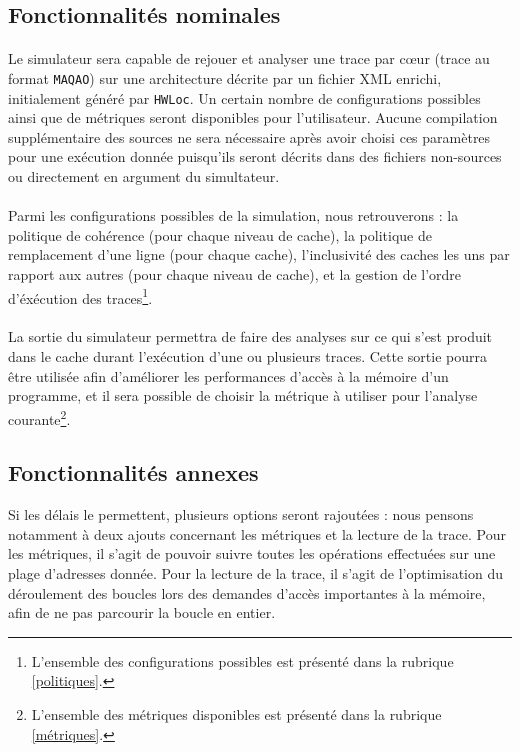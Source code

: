 \subsection{Fonctionnalités nominales}

\paragraph{}
Le simulateur sera capable de rejouer et analyser une trace par c\oe ur (trace au format \texttt{MAQAO}) sur une architecture décrite par un fichier XML enrichi, initialement généré par \texttt{HWLoc}. Un certain nombre de configurations possibles ainsi que de métriques seront disponibles pour l'utilisateur. Aucune compilation supplémentaire des sources ne sera nécessaire après avoir choisi ces paramètres pour une exécution donnée puisqu'ils seront décrits dans des fichiers non-sources ou directement en argument du simultateur. 

\paragraph{}
Parmi les configurations possibles de la simulation, nous retrouverons : la politique de cohérence (pour chaque niveau de cache), la politique de remplacement d'une ligne (pour chaque cache), l'inclusivité des caches les uns par rapport aux autres (pour chaque niveau de cache), et la gestion de l'ordre d'éxécution des traces\footnote{L'ensemble des configurations possibles est présenté dans la rubrique \ref{politiques}.}.

\paragraph{}
La sortie du simulateur permettra de faire des analyses sur ce qui s'est produit dans le cache durant l'exécution d'une ou plusieurs traces. Cette sortie pourra être utilisée afin d'améliorer les performances d'accès à la mémoire d'un programme, et il sera possible de choisir la métrique à utiliser pour l'analyse courante\footnote{L'ensemble des métriques disponibles est présenté dans la rubrique \ref{métriques}.}. 

\subsection{Fonctionnalités annexes}

Si les délais le permettent, plusieurs options seront rajoutées : nous pensons notamment à deux ajouts concernant les métriques et la lecture de la trace. Pour les métriques, il s'agit de pouvoir suivre toutes les opérations effectuées sur une plage d'adresses donnée. Pour la lecture de la trace, il s'agit de l'optimisation du déroulement des boucles lors des demandes d'accès importantes à la mémoire, afin de ne pas parcourir la boucle en entier.

